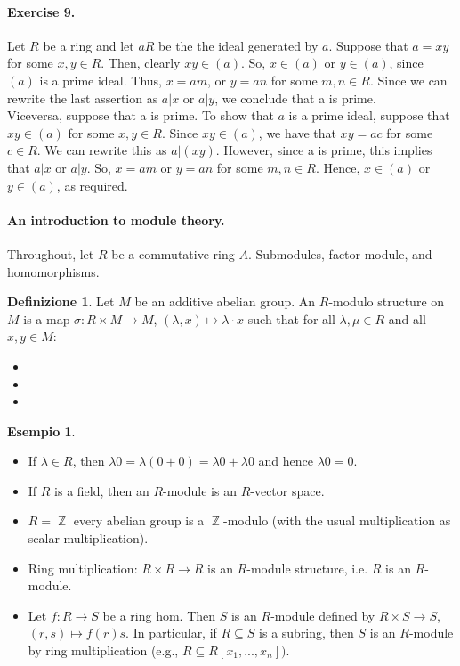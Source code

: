 \documentclass[12pt,a4paper]{report}
\theoremstyle{definition}
\newtheorem{defn}[teo]{Definizione}  %
\newtheorem{es}[teo]{Esempio}  %
\theoremstyle{num.custom-title}
\DeclareMathOperator{\Z}{\mathbb{Z}}
\DeclareMathOperator{\sse}{\subseteq}
\begin{document}
\paragraph{Exercise 9.}
Let $R$ be a ring and let $aR$ be the the ideal generated by $a$. Suppose that $a = xy$ for some $x,y \in R$. Then, clearly $xy \in (a)$. So, $x \in (a)$ or $y \in (a)$, since $(a)$ is a prime ideal. 
Thus, $x = am$, or $y = an$ for some $m,n \in R$.
Since we can rewrite the last assertion as $a|x$ or $a|y$, we conclude that a is prime.\\
Viceversa, suppose that a is prime. To show that $a$ is a prime ideal, suppose that $xy \in (a)$ for some $x,y \in R$. Since $xy \in (a)$, we have that $xy = ac$ for some $c \in R$. We can rewrite this as $a|(xy)$. However, since a is prime, this implies that $a|x$ or $a|y$. So, $x = am$ or $y = an$ for some $m,n \in R$. Hence, $x \in (a)$ or $y \in (a)$, as required. 



\paragraph{An introduction to module theory.} Throughout, let $R$ be a commutative ring $A$. Submodules, factor module, and homomorphisms.
\begin{defn}
Let $M$ be an additive abelian group. An $R$-modulo structure on $M$ is a map $\sigma : R \times M \to M$, $(\lambda, x) \mapsto \lambda \cdot x$ such that for all $\lambda, \mu \in R$ and all $x,y \in M$:
\begin{itemize}
\item 
\item
\item
\end{itemize}
\end{defn}

\begin{es}\
\begin{itemize}
\item If $\lambda \in R$, then $\lambda 0 = \lambda (0+0)= \lambda 0 + \lambda 0$ and hence $\lambda 0 = 0$.
\item If $R$ is a field, then an $R$-module is an $R$-vector space.
\item $R=\Z$ every abelian group is a $\Z$-modulo (with the usual multiplication as scalar multiplication).
\item Ring multiplication: $R \times R \to R$ is an $R$-module structure, i.e. $R$ is an $R$-module.
\item Let $f: R \to S$ be a ring hom. Then $S$ is an $R$-module defined by $R \times S \to S$, $(r,s) \mapsto f(r)s$. In particular, if $R \sse S$ is a subring, then $S$ is an $R$-module by ring multiplication (e.g., $R \sse R[x_1,...,x_n])$.
\end{itemize}
\end{es}
\end{document}
